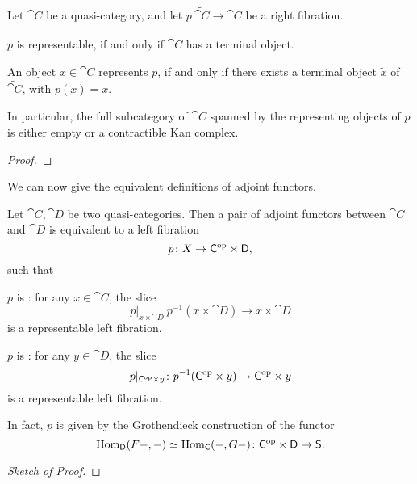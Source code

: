 \begin{proposition}
    Let $\cat C$ be a quasi-category,
    and let $p\:\tilde{\cat C}\to\cat C$ be a right fibration.
    \begin{itms}
        \item $p$ is representable, if and only if $\tilde{\cat C}$
        has a terminal object.
        \item An object $x\in\cat C$ represents $p$,
        if and only if there exists a terminal object $\tilde x$ of $\tilde{\cat C}$,
        with $p(\tilde x)=x$.
    \end{itms}
    In particular, the full subcategory of $\cat C$
    spanned by the representing objects of $p$
    is either empty or a contractible Kan complex.
\end{proposition}

\begin{proof}
    \nyw
\end{proof}

We can now give the equivalent definitions
of adjoint functors.

\begin{proposition}
    Let $\cat C,\cat D$ be two quasi-categories.
    Then a pair of adjoint functors between $\cat C$ and $\cat D$
    is equivalent to a left fibration 
    \[ p\colon X\to\mathsf{C}^{\mathrm{op}}\times\mathsf{D}, \]
    such that 
    \begin{itms}
        \item $p$ is :
        for any $x\in\cat C$, the slice 
        \[ p|_{x\times\cat D}\:p^{-1}(x\times\cat D)\to x\times\cat D \]
        is a representable left fibration.
        \item $p$ is :
        for any $y\in\cat D$, the slice 
        \[ p|_{\mathsf{C}^{\mathrm{op}}\times y}\colon p^{-1}(\mathsf{C}^{\mathrm{op}}\times y)\to \mathsf{C}^{\mathrm{op}}\times y \]
        is a representable left fibration.
    \end{itms}
    In fact, $p$ is given by the Grothendieck construction 
    of the functor
    \[ \operatorname{Hom}_{\mathsf{D}}(F-,-)\simeq\operatorname{Hom}_{\mathsf{C}}(-,G-)\colon\mathsf{C}^{\mathrm{op}}\times\mathsf{D}\to\mathsf{S}. \]
\end{proposition}

\begin{proof}[Sketch of Proof]
    \nyw
\end{proof}

